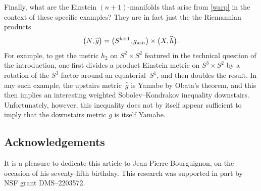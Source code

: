 \documentclass[pdftex]{sigma}
\numberwithin{equation}{section}
\begin{document}
Finally, what are the Einstein $(n+1)$-manifolds that arise from \eqref{warp} in the context of these specific examples? They are in fact just the
the Riemannian products
\begin{equation*}
\big(N, \widehat{g}\big)= \big(S^{k+1} , g_{\text{\tiny unit}}\big) \times \big(X, \widehat{h}\big).
\end{equation*}
For example, to get the metric $h_2$ on $S^2 \times S^2$ featured in the technical question of the introduction,
one first divides a product Einstein metric on $S^3 \times S^2$ by a rotation
of the $S^3$ factor around an equatorial~$S^1$, and then doubles the result. In any such example, the upstairs metric~$\widehat{g}$ is Yamabe by Obata's theorem,
and this then implies an interesting weighted Sobolev--Kondrakov inequality downstairs. Unfortunately, however, this inequality does not by itself appear sufficient to imply that the downstairs metric $g$ is itself Yamabe.

\subsection*{Acknowledgements}
It is a pleasure to dedicate this article to Jean-Pierre Bourguignon, on the occasion of
his seventy-fifth birthday. This research was supported in part by NSF grant DMS--2203572.
\end{document}
